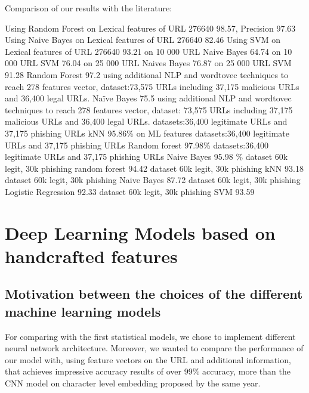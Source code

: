 \documentclass{article}
\begin{document}
    Comparison of our results with the literature:

    \cite{LexicalFeatureSelection} Using Random Forest on Lexical features of URL 276640 98.57, Precision 97.63%
    \cite{LexicalFeatureSelection} Using Naive Bayes on Lexical features of URL 276640 82.46
    \cite{LexicalFeatureSelection} Using SVM on Lexical features of URL 276640 93.21
    \cite[]{PhishSafe} on 10 000 URL Naive Bayes 64.74
    \cite[]{PhishSafe} on 10 000 URL SVM 76.04
    \cite[]{PhishSafe} on 25 000 URL Naives Bayes 76.87
    \cite[]{PhishSafe} on 25 000 URL SVM 91.28
    \cite{NLPPhishingURLDetection} Random Forest 97.2 using additional NLP and wordtovec techniques to reach 278 features vector, dataset:73,575 URLs including 37,175 malicious URLs and 36,400 legal URLs.
    \cite{NLPPhishingURLDetection} Naïve Bayes 75.5 using additional NLP and wordtovec techniques to reach 278 features vector, dataset: 73,575 URLs including 37,175 malicious URLs and 36,400 legal URLs.
    \cite{PhishingURLDetection} datasets:36,400 legitimate URLs and 37,175 phishing URLs kNN 95.86\% on ML features
    \cite{PhishingURLDetection} datasets:36,400 legitimate URLs and 37,175 phishing URLs Random forest 97.98\%
    \cite{PhishingURLDetection} datasets:36,400 legitimate URLs and 37,175 phishing URLs Naive Bayes 95.98 \%
    \cite{PhishingLoginURLDetection} dataset 60k legit, 30k phishing random forest 94.42
    \cite{PhishingLoginURLDetection} dataset 60k legit, 30k phishing kNN 93.18
    \cite{PhishingLoginURLDetection} dataset 60k legit, 30k phishing Naive Bayes 87.72
    \cite{PhishingLoginURLDetection} dataset 60k legit, 30k phishing Logistic Regression 92.33
    \cite{PhishingLoginURLDetection} dataset 60k legit, 30k phishing SVM 93.59


    \section{Deep Learning Models based on handcrafted features}\label{sec:deep-learning-models}

    \subsection{Motivation between the choices of the different machine learning models}\label{subsec:motivation-between-the-choices-of-the-different-machine-learning-models}
    For comparing with the first statistical models, we chose to implement different neural network architecture.
    Moreover, we wanted to compare the performance of our model with\cite{EfficientDeepLearningPhishingDetection}, using feature vectors on the URL and additional information, that achieves impressive accuracy results of over 99\% accuracy, more than the CNN model on character level embedding proposed by\cite{CharacterLevelCNN} the same year.
\end{document}
